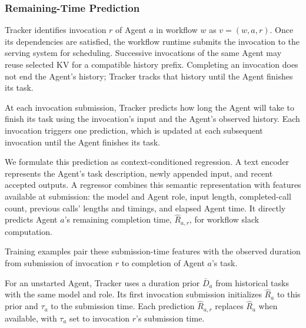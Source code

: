 \subsubsection{Remaining-Time Prediction}
\label{sec:tracker-prediction}

Tracker identifies invocation $r$ of Agent $a$ in workflow $w$ as
$v=(w,a,r)$. Once its dependencies are satisfied, the workflow runtime
submits the invocation to the serving system for scheduling. Successive
invocations of the same Agent may reuse selected KV for a compatible
history prefix. Completing an invocation does not end the Agent's
history; Tracker tracks that history until the Agent finishes its task.

At each invocation submission, Tracker predicts how long the Agent will
take to finish its task using the invocation's input and the Agent's
observed history. Each invocation triggers one prediction, which is
updated at each subsequent invocation until the Agent finishes its task.

We formulate this prediction as context-conditioned regression. A text
encoder represents the Agent's task description, newly appended input,
and recent accepted outputs. A regressor combines this semantic
representation with features available at submission: the model and
Agent role, input length, completed-call count, previous calls' lengths
and timings, and elapsed Agent time. It directly predicts Agent $a$'s
remaining completion time, $\widehat R_{a,r}$, for workflow slack
computation.

Training examples pair these submission-time features with the observed
duration from submission of invocation $r$ to completion of Agent $a$'s
task.

For an unstarted Agent, Tracker uses a duration prior $\bar D_a$ from
historical tasks with the same model and role. Its first invocation
submission initializes $\widehat R_a$ to this prior and $\tau_a$ to the
submission time. Each prediction $\widehat R_{a,r}$ replaces
$\widehat R_a$ when available, with $\tau_a$ set to invocation $r$'s
submission time.

